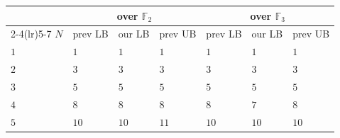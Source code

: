 \documentclass[11pt]{article}
\theoremstyle{definition}
\newcommand{\F}{\mathbb{F}}
\begin{document}
\begin{table}[!ht]
  \centering
  \setlength{\tabcolsep}{6pt}
  \begin{tabular}{lllllll}
    \toprule
    & \multicolumn{3}{c}{over $\F_2$}                           & \multicolumn{3}{c}{over $\F_3$}                                                                                                                                                                                                  \\
    \cmidrule(lr){2-4}\cmidrule(lr){5-7}
    $N$  & prev LB                                                   & our LB                          & prev UB                                                  & prev LB                                                   & our LB       & prev UB                                                  \\
    \midrule
    $1$  & $1$                                                       & $1$                             & $1$                                                      & $1$                                                       & $1$          & $1$                                                      \\
    $2$  & $3$~\cite{winograd1977some,alder1981algorithmic}          & $3$                             & $3$~\cite{toom1963complexity}                            & $3$~\cite{winograd1977some,alder1981algorithmic}          & $3$          & $3$~\cite{toom1963complexity}                            \\
    $3$  & $5$~\cite{winograd1977some,alder1981algorithmic}          & $5$                             & $5$~\cite{averbuch1991classification,blaser2005complete} & $5$~\cite{winograd1977some,alder1981algorithmic}          & $5$          & $5$~\cite{averbuch1991classification,blaser2005complete} \\
    $4$  & $8$~\cite{averbuch1991classification,blaser2005complete}  & $8$                             & $8$~\cite{cenk2011multiplication}                        & $8$~\cite{averbuch1991classification,blaser2005complete}  & $7$          & $8$~\cite{cenk2011multiplication}                        \\
    $5$  & $10$~\cite{averbuch1991classification,blaser2005complete} & $10$                            & $11$~\cite{cenk2011multiplication}                       & $10$~\cite{averbuch1991classification,blaser2005complete} & $10$         & $10$~\cite{barbulescu2012finding}                        \\

\end{tabular}
\end{table}
\end{document}
